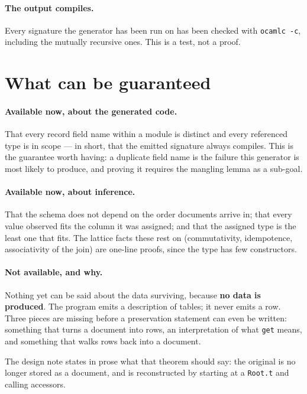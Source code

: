 \documentclass[11pt,a4paper]{article}
\begin{document}
\paragraph{The output compiles.} Every signature the generator has been run on
has been checked with \texttt{ocamlc -c}, including the mutually recursive
ones. This is a test, not a proof.

\section{What can be guaranteed}

\paragraph{Available now, about the generated code.} That every record field
name within a module is distinct and every referenced type is in scope --- in
short, that the emitted signature always compiles. This is the guarantee worth
having: a duplicate field name is the failure this generator is most likely to
produce, and proving it requires the mangling lemma as a sub-goal.

\paragraph{Available now, about inference.} That the schema does not depend on
the order documents arrive in; that every value observed fits the column it
was assigned; and that the assigned type is the least one that fits. The
lattice facts these rest on (commutativity, idempotence, associativity of the
join) are one-line proofs, since the type has few constructors.

\paragraph{Not available, and why.} Nothing yet can be said about the data
surviving, because \textbf{no data is produced}. The program emits a
description of tables; it never emits a row. Three pieces are missing before a
preservation statement can even be written: something that turns a document
into rows, an interpretation of what \texttt{get} means, and something that
walks rows back into a document.

The design note states in prose what that theorem should say: the original is
no longer stored as a document, and is reconstructed by starting at a
\texttt{Root.t} and calling accessors.
\end{document}
